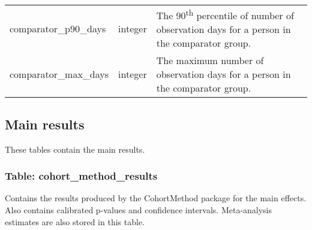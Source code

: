 \documentclass[
]{article}
\begin{document}
\begin{longtable}[]{@{}lll@{}}
\begin{minipage}[t]{0.23\columnwidth}
comparator\_p90\_days\strut
\end{minipage} & \begin{minipage}[t]{0.18\columnwidth}\raggedright
integer\strut
\end{minipage} & \begin{minipage}[t]{0.50\columnwidth}\raggedright
The 90\textsuperscript{th} percentile of number of observation days for
a person in the comparator group.\strut
\end{minipage}\tabularnewline
\begin{minipage}[t]{0.23\columnwidth}\raggedright
comparator\_max\_days\strut
\end{minipage} & \begin{minipage}[t]{0.18\columnwidth}\raggedright
integer\strut
\end{minipage} & \begin{minipage}[t]{0.50\columnwidth}\raggedright
The maximum number of observation days for a person in the comparator
group.\strut
\end{minipage}\tabularnewline
\bottomrule
\end{longtable}

\hypertarget{main-results}{%
\subsection{Main results}\label{main-results}}

These tables contain the main results.

\hypertarget{table-cohort_method_results}{%
\subsubsection{Table:
cohort\_method\_results}\label{table-cohort_method_results}}

Contains the results produced by the CohortMethod package for the main
effects. Also contains calibrated p-values and confidence intervals.
Meta-analysis estimates are also stored in this table.
\end{document}
